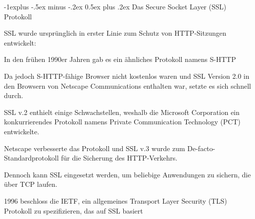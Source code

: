 \documentclass[a4paper]{article}
\makeatletter
\renewcommand{\subsection}{\@startsection{subsection}{2}{0mm}%
 {-1explus -.5ex minus -.2ex}%
 {0.5ex plus .2ex}%
 {\normalfont\normalsize\bfseries}}
\makeatother
\begin{document}
\begin{multicols}{3}
\begin{itemize*}
            \subsection{Das Secure Socket Layer (SSL)
                  Protokoll}
            \begin{itemize*}
                  \item       SSL wurde ursprünglich in erster Linie zum Schutz von HTTP-Sitzungen
                  entwickelt:
                  \begin{itemize*}
                        \item In den frühen 1990er Jahren gab es ein ähnliches Protokoll namens S-HTTP
                        \item Da jedoch S-HTTP-fähige Browser nicht kostenlos waren und SSL Version 2.0 in den Browsern von Netscape Communications enthalten war, setzte es sich schnell durch.
                        \item SSL v.2 enthielt einige Schwachstellen, weshalb die Microsoft Corporation ein konkurrierendes Protokoll namens Private Communication Technology (PCT) entwickelte.
                        \item Netscape verbesserte das Protokoll und SSL v.3 wurde zum De-facto-Standardprotokoll für die Sicherung des HTTP-Verkehrs.
                        \item Dennoch kann SSL eingesetzt werden, um beliebige Anwendungen zu sichern, die über TCP laufen.
                        \item 1996 beschloss die IETF, ein allgemeines Transport Layer Security (TLS) Protokoll zu spezifizieren, das auf SSL basiert
                  \end{itemize*}
            \end{itemize*}


\end{itemize*}
\end{multicols}
\end{document}
